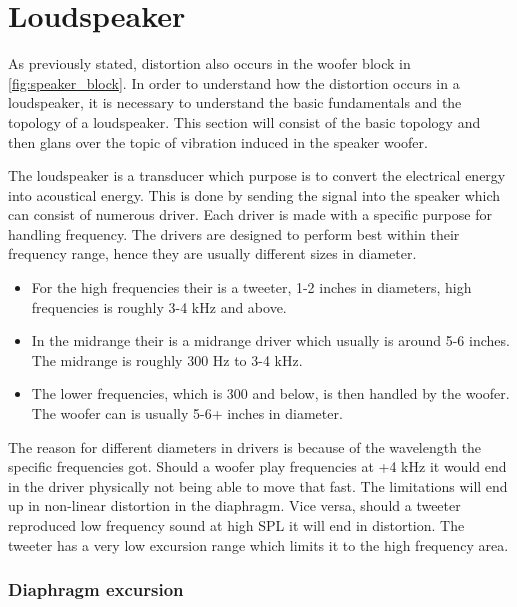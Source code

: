 \section{Loudspeaker}

As previously stated, distortion also occurs in the woofer block in \autoref{fig:speaker_block}. In order to understand how the distortion occurs in a loudspeaker, it is necessary to understand the basic fundamentals and the topology of a loudspeaker. This section will consist of the basic topology and then glans over the topic of vibration induced in the speaker woofer.

The loudspeaker is a transducer which purpose is to convert the electrical energy into acoustical energy. This is done by sending the signal into the speaker which can consist of numerous driver. Each driver is made with a specific purpose for handling frequency. The drivers are designed to perform best within their frequency range, hence they are usually different sizes in diameter.
\begin{itemize}
\item[] For the high frequencies their is a tweeter, 1-2 inches in diameters, high frequencies is roughly 3-4 kHz and above.
\item[] In the midrange their is a midrange driver which usually is around 5-6 inches. The midrange is roughly 300 Hz to 3-4 kHz. 
\item[] The lower frequencies, which is 300 and below, is then handled by the woofer. The woofer can is usually 5-6+ inches in diameter.
\end{itemize}
The reason for different diameters in drivers is because of the wavelength the specific frequencies got. Should a woofer play frequencies at +4 kHz it would end in the driver physically not being able to move that fast. The limitations will end up in non-linear distortion in the diaphragm. Vice versa, should a tweeter reproduced low frequency sound at high \gls{SPL} it will end in distortion. The tweeter has a very low excursion range which limits it to the high frequency area.



\subsubsection*{Diaphragm excursion}

